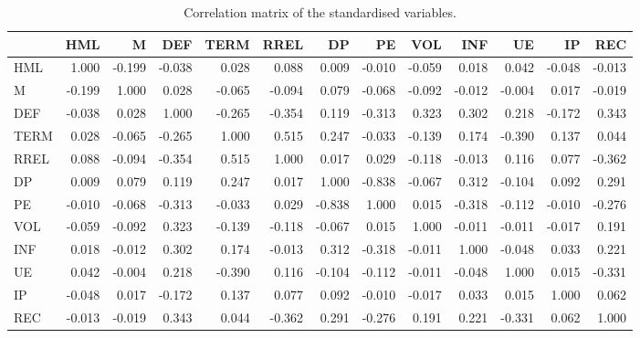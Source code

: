 \begin{table}
\centering
\caption{Correlation matrix of the standardised variables.}
\label{tab:Data_correlation}
\begin{tabular}{lrrrrrrrrrrrr}
\toprule
{} &    HML &      M &    DEF &   TERM &   RREL &     DP &     PE &    VOL &    INF &     UE &     IP &    REC \\
\midrule
HML  &  1.000 & -0.199 & -0.038 &  0.028 &  0.088 &  0.009 & -0.010 & -0.059 &  0.018 &  0.042 & -0.048 & -0.013 \\
M    & -0.199 &  1.000 &  0.028 & -0.065 & -0.094 &  0.079 & -0.068 & -0.092 & -0.012 & -0.004 &  0.017 & -0.019 \\
DEF  & -0.038 &  0.028 &  1.000 & -0.265 & -0.354 &  0.119 & -0.313 &  0.323 &  0.302 &  0.218 & -0.172 &  0.343 \\
TERM &  0.028 & -0.065 & -0.265 &  1.000 &  0.515 &  0.247 & -0.033 & -0.139 &  0.174 & -0.390 &  0.137 &  0.044 \\
RREL &  0.088 & -0.094 & -0.354 &  0.515 &  1.000 &  0.017 &  0.029 & -0.118 & -0.013 &  0.116 &  0.077 & -0.362 \\
DP   &  0.009 &  0.079 &  0.119 &  0.247 &  0.017 &  1.000 & -0.838 & -0.067 &  0.312 & -0.104 &  0.092 &  0.291 \\
PE   & -0.010 & -0.068 & -0.313 & -0.033 &  0.029 & -0.838 &  1.000 &  0.015 & -0.318 & -0.112 & -0.010 & -0.276 \\
VOL  & -0.059 & -0.092 &  0.323 & -0.139 & -0.118 & -0.067 &  0.015 &  1.000 & -0.011 & -0.011 & -0.017 &  0.191 \\
INF  &  0.018 & -0.012 &  0.302 &  0.174 & -0.013 &  0.312 & -0.318 & -0.011 &  1.000 & -0.048 &  0.033 &  0.221 \\
UE   &  0.042 & -0.004 &  0.218 & -0.390 &  0.116 & -0.104 & -0.112 & -0.011 & -0.048 &  1.000 &  0.015 & -0.331 \\
IP   & -0.048 &  0.017 & -0.172 &  0.137 &  0.077 &  0.092 & -0.010 & -0.017 &  0.033 &  0.015 &  1.000 &  0.062 \\
REC  & -0.013 & -0.019 &  0.343 &  0.044 & -0.362 &  0.291 & -0.276 &  0.191 &  0.221 & -0.331 &  0.062 &  1.000 \\
\bottomrule
\end{tabular}
\end{table}
